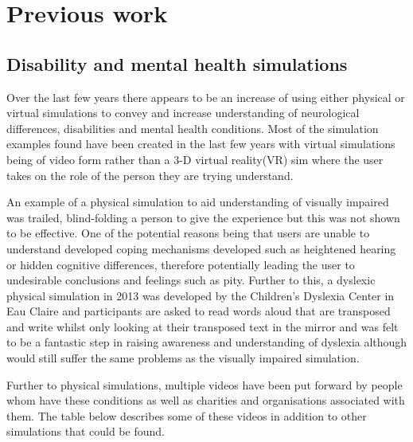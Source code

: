 \documentclass[11pt]{report}
\begin{document}
\section{Previous work}

\subsection{Disability and mental health simulations}
Over the last few years there appears to be an increase of using either physical or virtual simulations to convey and increase understanding of neurological differences, disabilities and mental health conditions. Most of the simulation examples found have been created in the last few years with virtual simulations being of video form rather than a 3-D virtual reality(VR) sim where the user takes on the role of the person they are trying understand.  

An example of a physical simulation to aid understanding of visually impaired was trailed, blind-folding a person to give the experience but this was not shown to be effective\cite{dd}. One of the potential reasons being that users are unable to understand developed coping mechanisms developed such as heightened hearing or hidden cognitive differences, therefore potentially leading the user to undesirable conclusions and feelings such as pity. Further to this, a dyslexic physical simulation in 2013 was developed by the Children’s Dyslexia Center in Eau Claire and participants are asked to read words aloud that are transposed and write whilst only looking at their transposed text in the mirror\cite{udyslexia} and was felt to be a fantastic step in raising awareness and understanding of dyslexia although would still suffer the same problems as the visually impaired simulation. 

Further to physical simulations, multiple videos have been put forward by people whom have these conditions as well as charities and organisations associated with them. The table below describes some of these videos in addition to other simulations that could be found. 
\end{document}
